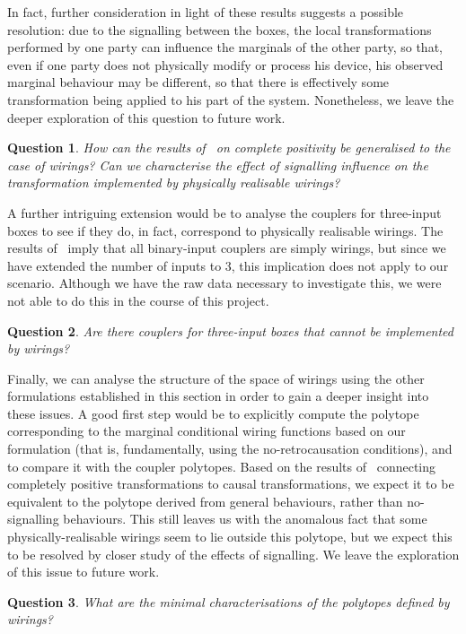 \documentclass[10pt, a4paper]{article}
\numberwithin{equation}{section} %
\theoremstyle{definition}
\theoremstyle{plain}
\newtheorem{question}{Question}
\newcommand{\?}{\mathrel{?}} %
\begin{document}
                  In fact, further consideration in light of these results suggests a possible resolution: due to the signalling between the boxes, the local transformations performed by one party can influence the marginals of the other party, so that, even if one party does not physically modify or process his device, his observed marginal behaviour may be different, so that there is effectively some transformation being applied to his part of the system. Nonetheless, we leave the deeper exploration of this question to future work.
                  \begin{question}
                    How can the results of~\cite{LocalTransformations} on complete positivity be generalised to the case of wirings? Can we characterise the effect of signalling influence on the transformation implemented by physically realisable wirings?
                  \end{question}

                  A further intriguing extension would be to analyse the couplers for three-input boxes to see if they do, in fact, correspond to physically realisable wirings. The results of~\cite{ShortEntangleSwap} imply that all binary-input couplers are simply wirings, but since we have extended the number of inputs to 3, this implication does not apply to our scenario. Although we have the raw data necessary to investigate this, we were not able to do this in the course of this project.
                  \begin{question}
                    Are there couplers for three-input boxes that cannot be implemented by wirings?
                  \end{question}

                  Finally, we can analyse the structure of the space of wirings using the other formulations established in this section in order to gain a deeper insight into these issues. A good first step would be to explicitly compute the polytope corresponding to the marginal conditional wiring functions based on our formulation (that is, fundamentally, using the no-retrocausation conditions), and to compare it with the coupler polytopes. Based on the results of~\cite{LocalTransformations} connecting completely positive transformations to causal transformations, we expect it to be equivalent to the polytope derived from general behaviours, rather than no-signalling behaviours. This still leaves us with the anomalous fact that some physically-realisable wirings seem to lie outside this polytope, but we expect this to be resolved by closer study of the effects of signalling. We leave the exploration of this issue to future work.
                  \begin{question}
                    What are the minimal characterisations of the polytopes defined by wirings?
                  \end{question}
\end{document}
